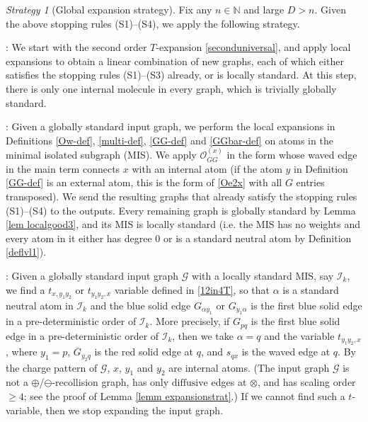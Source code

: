\documentclass{article}
\newcommand{\1}{\mathds{1}}
\numberwithin{equation}{section}
\newcommand{\al}{\alpha}
\renewcommand{\cal}{\mathcal}
\renewcommand{\geq}{\geqslant}
\renewcommand{\ge}{\geq}
\newcommand{\N}{\mathbb{N}}
\newcommand{\dashed}{\text{diffusive}}
\theoremstyle{plain} %
\theoremstyle{remark}
\newtheorem{strategy}[theorem]{Strategy}
\newcommand{\cor}{\color{red}}
\newcommand{\Iso}{{\mathcal I}}
\newcommand{\hty}[1]{{\cor (ht: #1) }}
\begin{document}

\begin{strategy}[Global expansion strategy]\label{strat_global}
Fix any $n\in \N$ and large $D>n$. Given the above stopping rules (S1)--(S4), we apply the following strategy.
 \vspace{5pt}

: We start with the second order $T$-expansion \eqref{seconduniversal}, and apply local expansions to obtain a linear combination of new graphs, each of which either satisfies the stopping rules (S1)--(S3) already, or is locally standard. At this step, there is only one internal molecule in every graph, which is trivially globally standard. %

\vspace{5pt}
: Given a globally standard input graph, we perform the local expansions in Definitions \ref{Ow-def}, \ref{multi-def}, \ref{GG-def} and \ref{GGbar-def} on atoms in the minimal isolated subgraph (MIS). We apply $\cal O_{GG}^{(x)}$ in the form whose waved edge in the main term connects $x$ with an internal atom (if the atom $y$ in Definition \ref{GG-def} is an external atom, this is the form of \eqref{Oe2x} with all $G$ entries transposed). We send the resulting graphs that already satisfy the stopping rules (S1)--(S4) to the outputs. Every remaining graph is globally standard by Lemma \ref{lem localgood3}, and its MIS %
is locally standard (i.e. the MIS has no weights and every atom in it either has degree 0 or is a standard neutral atom by Definition \ref{deflvl1}).

\vspace{5pt}
: Given a globally standard input graph $\cal G$ with a locally standard MIS, say $\Iso_k$, we find a $t_{x,y_1y_2}$ or $t_{y_1y_2,x}$ variable defined in \eqref{12in4T}, so that $\al$ is a standard neutral atom in $\Iso_k$ and the blue solid edge $G_{\al y_1}$ or $G_{y_1 \al}$ is the first blue solid edge in a pre-deterministic order of $\Iso_k$. %
More precisely, if $G_{pq}$ is the first blue solid edge in a pre-deterministic order of $\Iso_k$, then we take $\al=q$ and the variable $t_{y_1y_2,x}$, where $y_1=p$, $\overline G_{y_2 q}$ is the red solid edge at $q$, and $s_{qx}$ is the waved edge at $q$. By the charge pattern of $\cal G$, $x$, $y_1$ and $y_2$ are internal atoms. (The input graph $\cal G$ is not a $\oplus$/$\ominus$-recollision graph, has only $\dashed$ edges at $\otimes$, and has scaling order $\ge 4$; see the proof of Lemma \ref{lemm expansionstrat}.)
If we cannot find such a $t$-variable, then we stop expanding the input graph.


\end{strategy}
\end{document}
